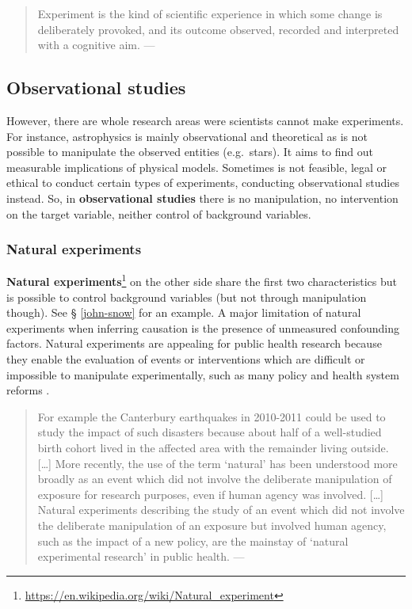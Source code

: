 \documentclass[
  12pt,
]{book}
\DeclareRobustCommand{\href}[2]{#2\footnote{\url{#1}}}
\begin{document}
\begin{quote}
Experiment is the kind of scientific experience in which some change is deliberately provoked, and its outcome observed, recorded and interpreted with a cognitive aim. --- \citep{bunge2017philosophy}
\end{quote}

\subsection{Observational studies}\label{observational-studies}

However, there are whole research areas were scientists cannot make experiments. For instance, astrophysics is mainly observational and theoretical as is not possible to manipulate the observed entities (e.g.~stars). It aims to find out measurable implications of physical models. Sometimes is not feasible, legal or ethical to conduct certain types of experiments, conducting observational studies instead. So, in \textbf{observational studies} there is no manipulation, no intervention on the target variable, neither control of background variables.

\subsubsection{Natural experiments}\label{natural-experiments}

\href{https://en.wikipedia.org/wiki/Natural_experiment}{\textbf{Natural experiments}} on the other side share the first two characteristics but is possible to control background variables (but not through manipulation though). See § \ref{john-snow} for an example. A major limitation of natural experiments when inferring causation is the presence of unmeasured confounding factors. Natural experiments are appealing for public health research because they enable the evaluation of events or interventions which are difficult or impossible to manipulate experimentally, such as many policy and health system reforms \citep{de2021conceptualising}.

\begin{quote}
For example the Canterbury earthquakes in 2010-2011 could be used to study the impact of such disasters because about half of a well-studied birth cohort lived in the affected area with the remainder living outside. {[}\ldots{]} More recently, the use of the term `natural' has been understood more broadly as an event which did not involve the deliberate manipulation of exposure for research purposes, even if human agency was involved. {[}\ldots{]} Natural experiments describing the study of an event which did not involve the deliberate manipulation of an exposure but involved human agency, such as the impact of a new policy, are the mainstay of `natural experimental research' in public health. --- \citep{de2021conceptualising}
\end{quote}
\end{document}

